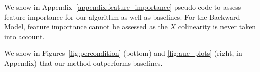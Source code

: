 We show in Appendix~\ref{appendix:feature_importance} pseudo-code to assess feature importance for our algorithm as well as baselines. For the Backward Model, feature importance cannot be assessed as the $X$ colinearity is never taken into account.


We show in Figures~\ref{fig:percondition} (bottom) and \ref{fig:auc_plots} (right, in Appendix) that our method outperforms baselines.

%


%
%

